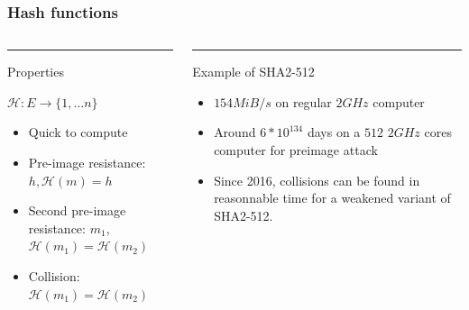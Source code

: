 \documentclass[12pt]{beamer}
\begin{document}
\begin{frame}
    \frametitle{Hash functions}
    \begin{columns}[T]
        \begin{column}{.48\linewidth}
            {\color{blue}\rule{\linewidth}{4pt}

            Properties}

            $\mathscr{H} : E \rightarrow \{1, \ldots n\}$

            \begin{itemize}
                \item Quick to compute
                \item Pre-image resistance: $h, \mathscr{H}(m) = h$
                \item Second pre-image resistance: $m_1$, $\mathscr{H}(m_1) = \mathscr{H}(m_2)$
                \item Collision: $\mathscr{H}(m_1) = \mathscr{H}(m_2)$
            \end{itemize}
        \end{column}
        \hfill
        \begin{column}{.48\linewidth}
            {\color{green!40!black}\rule{\linewidth}{4pt}

            Example of SHA2-512}

            \begin{itemize}
                \item $154 MiB/s$ on regular $2GHz$ computer
                \item Around $6*10^{134}$ days on a $512$ $2GHz$ cores computer for preimage attack
                \item Since 2016, collisions can be found in reasonnable time for a weakened variant
                    of SHA2-512.
            \end{itemize}
        \end{column}
    \end{columns}
\end{frame}
\end{document}
